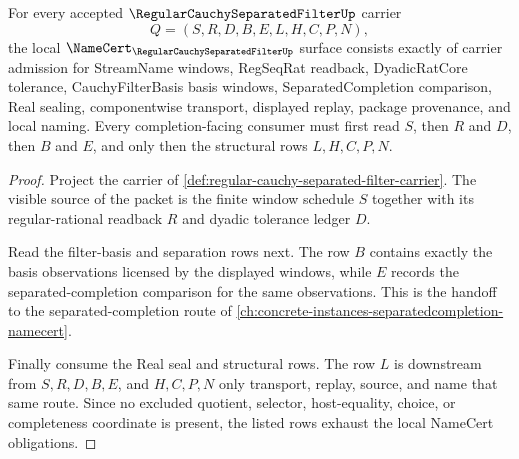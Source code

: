 \begin{theorem}
\label{thm:regular-cauchy-separated-filter-namecert-obligations}
For every accepted $\RegularCauchySeparatedFilterUp$ carrier
$$
Q=(S,R,D,B,E,L,H,C,P,N),
$$
the local $\NameCert_{\RegularCauchySeparatedFilterUp}$ surface consists exactly of carrier admission for StreamName windows, RegSeqRat readback, DyadicRatCore tolerance, CauchyFilterBasis basis windows, SeparatedCompletion comparison, Real sealing, componentwise transport, displayed replay, package provenance, and local naming. Every completion-facing consumer must first read $S$, then $R$ and $D$, then $B$ and $E$, and only then the structural rows $L,H,C,P,N$.
\end{theorem}
\begin{proof}
Project the carrier of \autoref{def:regular-cauchy-separated-filter-carrier}. The visible source of the packet is the finite window schedule $S$ together with its regular-rational readback $R$ and dyadic tolerance ledger $D$.

Read the filter-basis and separation rows next. The row $B$ contains exactly the basis observations licensed by the displayed windows, while $E$ records the separated-completion comparison for the same observations. This is the handoff to the separated-completion route of \autoref{ch:concrete-instances-separatedcompletion-namecert}.

Finally consume the Real seal and structural rows. The row $L$ is downstream from $S,R,D,B,E$, and $H,C,P,N$ only transport, replay, source, and name that same route. Since no excluded quotient, selector, host-equality, choice, or completeness coordinate is present, the listed rows exhaust the local NameCert obligations.
\end{proof}


\begin{closurestatus}{\RegularCauchySeparatedFilterUp}
  \theoryclosure{\seedClosure}
  \formalstatus{\unformalizedV}
\end{closurestatus}
